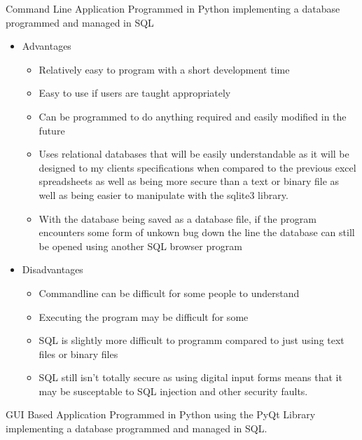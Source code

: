 Command Line Application Programmed in Python implementing a database programmed and managed in SQL

\begin{itemize}
	\item Advantages
	\begin{itemize}
		\item Relatively easy to program with a short development time
		\item Easy to use if users are taught appropriately
		\item Can be programmed to do anything required and easily modified in the future
		\item Uses relational databases that will be easily understandable as it will be designed to my clients specifications when compared to the previous excel spreadsheets as well as being more secure than a text or binary file as well as being easier to manipulate with the sqlite3 library.
		\item With the database being saved as a database file, if the program encounters some form of unkown bug down the line the database can still be opened using another SQL browser program
	\end{itemize}
	\item Disadvantages
	\begin{itemize}
		\item Commandline can be difficult for some people to understand 
		\item Executing the program may be difficult for some
		\item SQL is slightly more difficult to programm compared to just using text files or binary files
	    \item SQL still isn't totally secure as using digital input forms means that it may be susceptable to SQL injection and other security faults.
	\end{itemize}
\end{itemize}

GUI Based Application Programmed in Python using the PyQt Library implementing a database programmed and managed in SQL.

